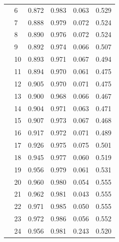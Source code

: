 \begin{longtable}{llcccc}
 & 6 & 0.872 & 0.983 & 0.063 & 0.529 \\
 & 7 & 0.888 & 0.979 & 0.072 & 0.524 \\
 & 8 & 0.890 & 0.976 & 0.072 & 0.524 \\
 & 9 & 0.892 & 0.974 & 0.066 & 0.507 \\
 & 10 & 0.893 & 0.971 & 0.067 & 0.494 \\
 & 11 & 0.894 & 0.970 & 0.061 & 0.475 \\
 & 12 & 0.905 & 0.970 & 0.071 & 0.475 \\
 & 13 & 0.900 & 0.968 & 0.066 & 0.467 \\
 & 14 & 0.904 & 0.971 & 0.063 & 0.471 \\
 & 15 & 0.907 & 0.973 & 0.067 & 0.468 \\
 & 16 & 0.917 & 0.972 & 0.071 & 0.489 \\
 & 17 & 0.926 & 0.975 & 0.075 & 0.501 \\
 & 18 & 0.945 & 0.977 & 0.060 & 0.519 \\
 & 19 & 0.956 & 0.979 & 0.061 & 0.531 \\
 & 20 & 0.960 & 0.980 & 0.054 & 0.555 \\
 & 21 & 0.962 & 0.981 & 0.043 & 0.555 \\
 & 22 & 0.971 & 0.985 & 0.050 & 0.555 \\
 & 23 & 0.972 & 0.986 & 0.056 & 0.552 \\
 & 24 & 0.956 & 0.981 & 0.243 & 0.520 \\
\end{longtable}
\endgroup
